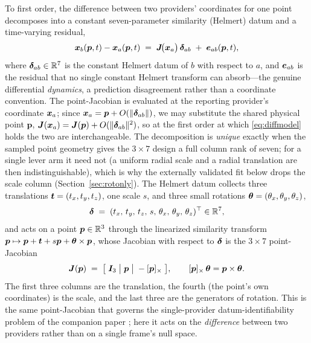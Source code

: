 To first order, the difference between two providers' coordinates for one point
decomposes into a constant seven-parameter similarity (Helmert) datum and a
time-varying residual,
\begin{equation}
  \bm{x}_b(\bm{p},t) - \bm{x}_a(\bm{p},t)
  \;=\; \bm{J}\!\bigl(\bm{x}_a\bigr)\,\bm{\delta}_{ab} \;+\; \bm{e}_{ab}(\bm{p},t),
  \label{eq:diffmodel}
\end{equation}
where $\bm{\delta}_{ab}\in\mathbb{R}^{7}$ is the constant Helmert datum of $b$ with respect to
$a$, and $\bm{e}_{ab}$ is the residual that no single constant Helmert transform can
absorb---the genuine differential \emph{dynamics}, a prediction disagreement rather
than a coordinate convention. The point-Jacobian is evaluated at the reporting
provider's coordinate $\bm{x}_a$; since $\bm{x}_a=\bm{p}+O(\|\bm{\delta}_{ab}\|)$, we may
substitute the shared physical point $\bm{p}$, $\bm{J}(\bm{x}_a)=\bm{J}(\bm{p})+O(\|\bm{\delta}_{ab}\|^{2})$,
so at the first order at which \eqref{eq:diffmodel} holds the two are interchangeable.
The decomposition is \emph{unique} exactly when the sampled point geometry gives the
$3\times7$ design a full column rank of seven; for a single lever arm it need not (a
uniform radial scale and a radial translation are then indistinguishable), which is
why the externally validated fit below drops the scale column
(Section~\ref{sec:rotonly}). The Helmert datum collects three translations
$\bm{t}=(t_x,t_y,t_z)$, one scale $s$, and three small rotations
$\bm{\theta}=(\theta_x,\theta_y,\theta_z)$,
\begin{equation}
  \bm{\delta} \;=\; (t_x,\,t_y,\,t_z,\,s,\,\theta_x,\,\theta_y,\,\theta_z)^\top \in \mathbb{R}^7,
  \label{eq:datumvec}
\end{equation}
and acts on a point $\bm{p}\in\mathbb{R}^3$ through the linearized similarity transform
$\bm{p}\mapsto\bm{p}+\bm{t}+s\bm{p}+\bm{\theta}\times\bm{p}$, whose Jacobian with respect
to $\bm{\delta}$ is the $3\times7$ point-Jacobian
\begin{equation}
  \bm{J}(\bm{p}) \;=\; \bigl[\;\bm{I}_3\;\big|\;\bm{p}\;\big|\;-[\bm{p}]_\times\;\bigr],
  \qquad
  [\bm{p}]_\times\,\bm{\theta} = \bm{p}\times\bm{\theta} .
  \label{eq:pointjac}
\end{equation}
The first three columns are the translation, the fourth (the point's own
coordinates) is the scale, and the last three are the generators of rotation. This
is the same point-Jacobian that governs the single-provider datum-identifiability
problem of the companion paper \citep{baweja2026datum}; here it acts on the
\emph{difference} between two providers rather than on a single frame's null space.

